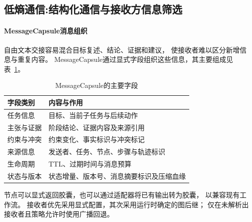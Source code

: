 

\subsection{低熵通信:结构化通信与接收方信息筛选}

\paragraph{MessageCapsule消息组织}

自由文本交接容易混合目标复述、结论、证据和建议，
使接收者难以区分新增信息与重复内容。
MessageCapsule通过显式字段组织这些信息，其主要组成见
表~\ref{tab:mesh_capsule_fields}。

\begin{table}[htbp]
    \centering
    \caption{MessageCapsule的主要字段}
    \label{tab:mesh_capsule_fields}
    \begin{tabular}{p{}p{}}
        \toprule
        字段类别 & 内容与作用 \\
        \midrule
        任务信息 & 目标、当前子任务与后续动作 \\
        主张与证据 & 阶段结论、证据内容及来源引用 \\
        约束与冲突 & 约束变化、事实标识与冲突标记 \\
        来源信息 & 发送者、任务、节点、步骤与轨迹标识 \\
        生命周期 & TTL、过期时间与消息预算 \\
        状态与版本 & 状态增量、版本号、消息摘要标识及压缩血缘 \\
        \bottomrule
    \end{tabular}
\end{table}

节点可以显式返回胶囊，也可以通过适配器将已有输出转为胶囊，
以兼容现有工作流。
接收者优先采用显式配置，其次采用运行时确定的图后继；
仅在未解析出接收者且策略允许时使用广播回退。


